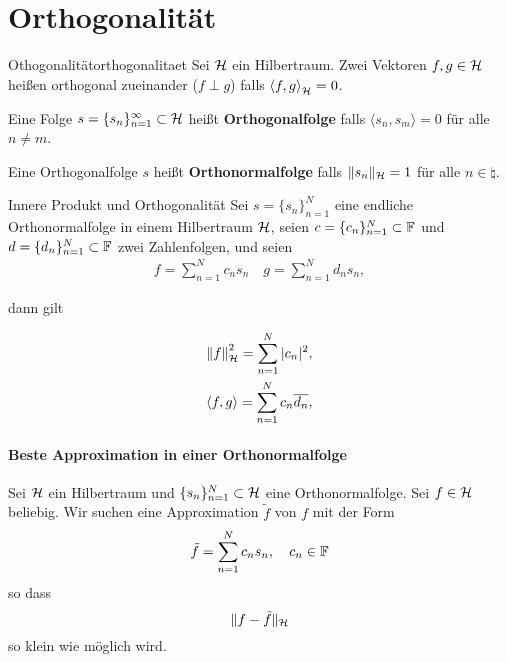 \section{Orthogonalität}

\begin{boringDef}{Othogonalität}{orthogonalitaet}
  Sei $\mathcal{H}$ ein Hilbertraum.
  Zwei Vektoren $f, g \in \mathcal{H}$ heißen orthogonal zueinander ($f \perp g$) falls ${\langle f, g \rangle}_{\mathcal{H}} = 0$.

  Eine Folge $s = \{s_{n}\}_{n=1}^{\infty} \subset \mathcal{H}$ heißt \textbf{Orthogonalfolge} falls $\langle s_{n}, s_{m} \rangle = 0$ für alle $n \neq m$.

  Eine Orthogonalfolge $s$ heißt \textbf{Orthonormalfolge} falls $\| s_{n}\|_{\mathcal{H}} = 1$ für alle $n \in \natural$.
\end{boringDef}

\begin{recipe}{Innere Produkt und Orthogonalität}
Sei $s = \{s_{n}\}_{n=1}^{N}$ eine endliche Orthonormalfolge in einem Hilbertraum $\mathcal{H}$, seien $c = \{c_{n}\}_{n=1}^{N} \subset \mathbb{F}$  und $d = \{d_{n}\}_{n=1}^{N} \subset \mathbb{F}$ zwei Zahlenfolgen, und seien
\begin{align*}
  f = \sum\limits_{n=1}^{N} c_{n} s_{n} \quad g = \sum\limits_{n=1}^{N} d_{n} s_{n},
\end{align*}

dann gilt

\begin{align}
  {\|f\|}_{\mathcal{H}}^{2} = \sum\limits_{n=1}^{N} | c_{n}|^{2},\\
  \langle f, g \rangle = \sum\limits_{n=1}^{N} c_{n} \overline{d_{n}},
\end{align}
\end{recipe}

\paragraph{Beste Approximation in einer Orthonormalfolge}
Sei $\mathcal{H}$ ein Hilbertraum und $\{s_{n}\}_{n=1}^{N}\subset \mathcal{H}$ eine Orthonormalfolge.
Sei $f \in \mathcal{H}$ beliebig.
Wir suchen eine Approximation $\tilde{f}$ von $f$ mit der Form
\begin{equation}
  \tilde{f} = \sum\limits_{n=1}^{N}c_{n}s_{n}, \quad c_{n} \in \mathbb{F}
\end{equation}
so dass
\begin{equation*}
  \| f - \tilde{f} \|_{\mathcal{H}}
\end{equation*}
so klein wie möglich wird.


